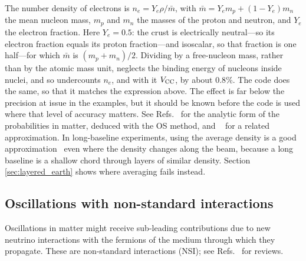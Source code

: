 \documentclass[final,5p,times,twocolumn,sort,compress]{elsarticle}
\providecommand{\Ref}{}
\newcommand{\Refs}{Refs.}
\begin{document}
The number density of electrons is $n_e = Y_e \rho / \bar{m}$, with $\bar{m} = Y_e m_p + (1 - Y_e) m_n$ the mean nucleon mass, $m_p$ and $m_n$ the masses of the proton and neutron, and $Y_e$ the electron fraction.  Here $Y_e = 0.5$: the crust is electrically neutral---so its electron fraction equals its proton fraction---and isoscalar, so that fraction is one half---for which $\bar{m}$ is $(m_p+m_n)/2$.  Dividing by a free-nucleon mass, rather than by the atomic mass unit, neglects the binding energy of nucleons inside nuclei, and so undercounts $n_e$, and with it $V_{\rm CC}$, by about $0.8\%$.  The code does the same, so that it matches the expression above.  The effect is far below the precision at issue in the examples, but it should be known before the code is used where that level of accuracy matters.  See \Refs\ \cite{Ohlsson:1999xb, Ohlsson:1999um} for the analytic form of the probabilities in matter, deduced with the OS method, and \Ref\ \cite{Freund:2001pn} for a related approximation.  In long-baseline experiments, using the average density is a good approximation\ \cite{Petcov:1998su, Freund:1999gy} even where the density changes along the beam, because a long baseline is a shallow chord through layers of similar density.  Section \ref{sec:layered_earth} shows where averaging fails instead.


\subsection{Oscillations with non-standard interactions}

Oscillations in matter might receive sub-leading contributions due to new neutrino interactions with the fermions of the medium through which they propagate.  These are non-standard interactions (NSI); see \Refs\ \cite{Ohlsson:2012kf, Miranda:2015dra, Farzan:2017xzy, Esteban:2018ppq} for reviews.  
\end{document}
